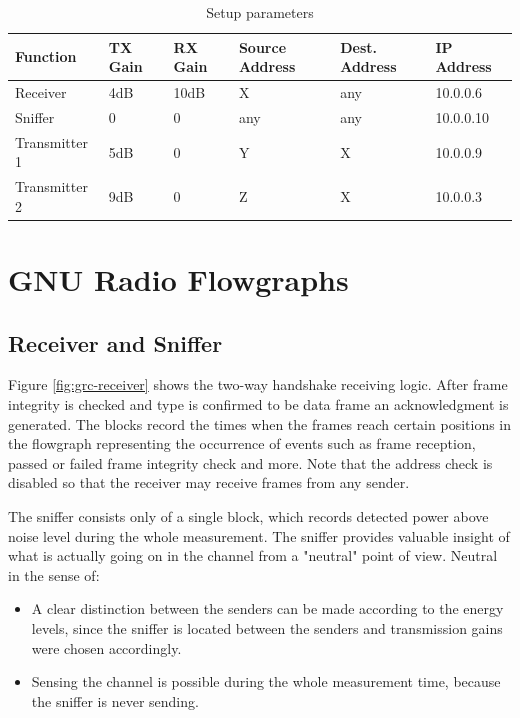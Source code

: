 \begin{table}[t]
	\label{tab:measurement-parameters}
	\begin{center}
		\begin{tabular}{p{2.5cm}p{2cm}p{2cm}p{1.5cm}p{1.5cm}p{2cm}}
			\toprule
			Function & TX Gain & RX Gain & Source Address & Dest. Address & IP Address\\
			\midrule
			Receiver 		& 4dB 	& 10dB 	& X 	& any	& 10.0.0.6\\
			Sniffer 		& 0 	& 0 	& any 	& any	& 10.0.0.10 \\
			Transmitter 1 	& 5dB 	& 0 	& Y 	& 	X 	& 10.0.0.9 \\
			Transmitter 2	& 9dB 	& 0 	& Z 	& 	X 	& 10.0.0.3 \\
			\bottomrule	
		\end{tabular}\caption{Setup parameters}
	\end{center}
\end{table}


\section{GNU Radio Flowgraphs}    

\subsection{Receiver and Sniffer}

Figure \ref{fig:grc-receiver} shows the two-way handshake receiving logic. After frame integrity is checked and type is confirmed to be data frame an acknowledgment is generated. The  blocks record the times when the frames reach certain positions in the flowgraph representing the occurrence of events such as frame reception, passed or failed frame integrity check and more. Note that the address check is disabled so that the receiver may receive frames from any sender.

The sniffer consists only of a single  block, which records detected power above noise level during the whole measurement. The sniffer provides valuable insight of what is actually going on in the channel from a "neutral" point of view. Neutral in the sense of:

\begin{itemize}
	\item A clear distinction between the senders can be made according to the energy levels, since the sniffer is located between the senders and transmission gains were chosen accordingly.
	\item Sensing the channel is possible during the whole measurement time, because the sniffer is never sending.
\end{itemize}

